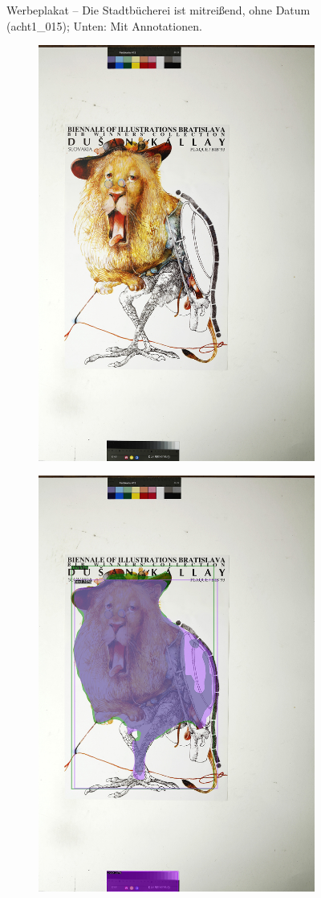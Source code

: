 \documentclass[a4paper,12pt,ngerman]{article}
\begin{document}
\begin{figure}[ht]
\begin{subfigure}[b]{\linewidth}
	\end{subfigure}
	\caption{Werbeplakat – Die Stadtbücherei ist mitreißend, ohne Datum (acht1\_015); Unten: Mit Annotationen.}
\end{figure}

\newpage
\begin{landscape}
\begin{figure}[ht]
	\begin{subfigure}[b]{0.5\linewidth}
	\centering
	\includegraphics[height=\linewidth]{Abbildung_30_(acht1_023)}
	\end{subfigure}
	\begin{subfigure}[b]{0.5\linewidth}
	\centering
	\includegraphics[height=\linewidth]{Abbildung_30_(acht1_023)_with_detections}

\end{subfigure}
\end{figure}
\end{landscape}
\end{document}
